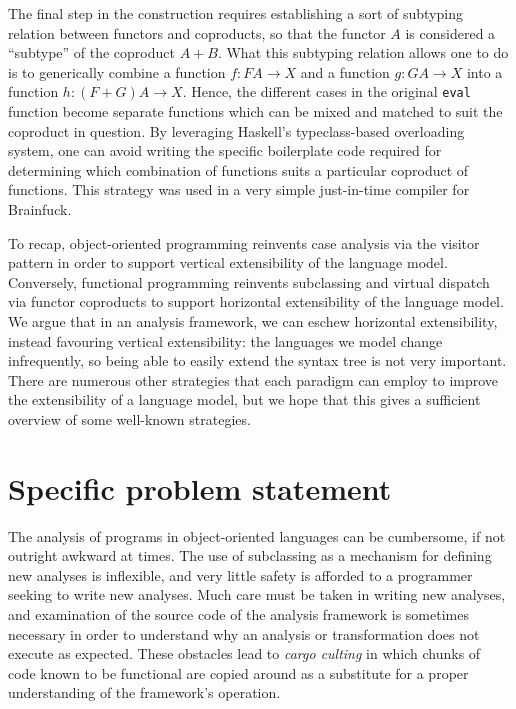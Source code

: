 \documentclass[letterpaper,11pt]{article}
\newcommand{\codesnip}{\texttt}
\begin{document}
The final step in the construction requires establishing a sort of subtyping
relation between functors and coproducts, so that the functor $A$ is considered
a ``subtype'' of the coproduct $A + B$.
What this subtyping relation allows one to do is to generically combine a
function $f : F A \to X$ and a function $g : G A \to X$ into a function
$h : (F + G) A \to X$.
Hence, the different cases in the original \codesnip{eval} function become
separate functions which can be mixed and matched to suit the coproduct in
question.
By leveraging Haskell's typeclass-based overloading system, one can avoid
writing the specific boilerplate code required for determining which
combination of functions suits a particular coproduct of functions.
This strategy was used in a very simple just-in-time compiler for
Brainfuck\cite{Fuckdown}.

To recap, object-oriented programming reinvents case analysis via the visitor
pattern in order to support vertical extensibility of the language model.
Conversely, functional programming reinvents subclassing and virtual dispatch
via functor coproducts to support horizontal extensibility of the language
model. We argue that in an analysis framework, we can eschew horizontal
extensibility, instead favouring vertical extensibility: the languages we model
change infrequently, so being able to easily extend the syntax tree is not very
important. There are numerous other strategies that each paradigm can employ to
improve the extensibility of a language model, but we hope that this gives a
sufficient overview of some well-known strategies.

\section{Specific problem statement}

The analysis of programs in object-oriented languages can be cumbersome, if not
outright awkward at times. The use of subclassing as a mechanism for defining
new analyses is inflexible, and very little safety is afforded to a programmer
seeking to write new analyses. Much care must be taken in writing new analyses,
and examination of the source code of the analysis framework is sometimes
necessary in order to understand why an analysis or transformation does not
execute as expected. These obstacles lead to \emph{cargo culting} in which
chunks of code known to be functional are copied around as a substitute for a
proper understanding of the framework's operation.
\end{document}
